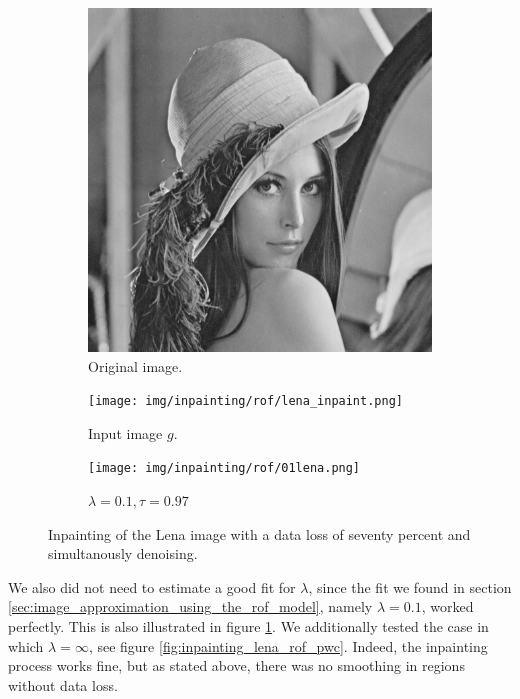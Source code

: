 \documentclass{scrreprt}
\begin{document}
        \begin{figure}[!ht]
            \centering
            \begin{subfigure}[b]{0.30\textwidth}
                \includegraphics[width=\textwidth]{img/images/lena.png}
                \caption{Original image.}
            \end{subfigure}
            \begin{subfigure}[b]{0.30\textwidth}
                \texttt{[image: img/inpainting/rof/lena\_inpaint.png]}
                \caption{Input image $g$.}
            \end{subfigure}
            \begin{subfigure}[b]{0.30\textwidth}
                \texttt{[image: img/inpainting/rof/01lena.png]}
                \caption{$\lambda = 0.1, \tau = 0.97$}
            \end{subfigure}
            \caption[Inpainting with seventy percent data loss with denoising.]{Inpainting of the Lena image with a data loss of seventy percent and simultanously denoising.}
        \label{fig:inpainting_lena_rof}
        \end{figure}

        We also did not need to estimate a good fit for $\lambda$, since the fit we found in section \ref{sec:image_approximation_using_the_rof_model}, namely $\lambda = 0.1$, worked perfectly. This is also illustrated in figure \ref{fig:inpainting_lena_rof}. We additionally tested the case in which $\lambda = \infty$, see figure \ref{fig:inpainting_lena_rof_pwc}. Indeed, the inpainting process works fine, but as stated above, there was no smoothing in regions without data loss.
\end{document}
